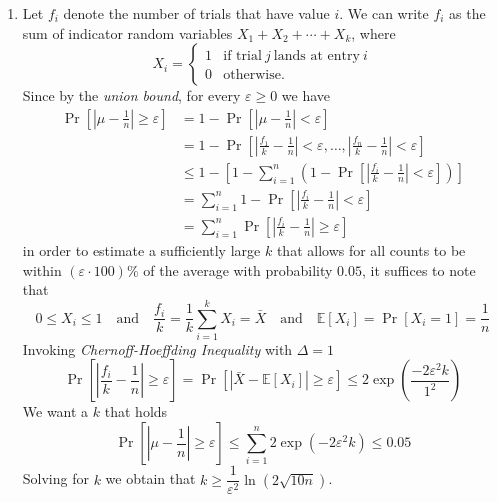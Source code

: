 \documentclass{article}
\begin{document}
\begin{enumerate}[leftmargin={*}, font={\bf}, label={\arabic*.}, ref={\arabic*}]
\begin{enumerate}[label={(\Alph*)}]
      \item \label{qst:3B}
        Let $X$ denote the number of trials needed to exhaust all entries in $[n]$. Then
        following a similar probabilistic analysis to the Coupon Collectors problem discussed
        in class, we set $n$ to $1000$ to obtain (in expectation):
        \[
          \mathbb{E}[X] = n \sum_{i=1}^{n} \frac{1}{i} = 1000 \sum_{i=1}^{1000} \frac{1}{i} = 7485.48.
        \]
        This result deviates only by a small margin from the experimental result from \ref{qst:2C}.
    \end{enumerate}

  \item \label{qst:4}
    Let $f_i$ denote the number of trials that have value $i$. We can write $f_i$ as the
    sum of indicator random variables $X_1 + X_2 + \cdots + X_k$, where
    \[
      X_i = 
        \begin{cases}
          1 & \text{if trial}\ j\ \text{lands at entry}\ i \\
          0 & \text{otherwise}.
        \end{cases}
    \]
    Since by the \emph{union bound}, for every $\varepsilon \geq 0$ we have
    \begin{align*}
      \Pr\left[\left|\mu - \frac{1}{n}\right| \geq \varepsilon\right]
      &= 1 - \Pr\left[\left|\mu - \frac{1}{n}\right| < \varepsilon\right] \\
      &= 1 - \Pr\left[\left|\frac{f_1}{k} - \frac{1}{n}\right| < \varepsilon, \ldots, \left|\frac{f_n}{k} - \frac{1}{n}\right| < \varepsilon\right] \\
      &\leq 1 - \left[1 - \sum_{i=1}^{n} \left(1 - \Pr\left[\left|\frac{f_i}{k} - \frac{1}{n}\right| < \varepsilon \right]\right)\right] \\
      &= \sum_{i=1}^{n} 1 - \Pr\left[\left|\frac{f_i}{k} - \frac{1}{n}\right| < \varepsilon \right] \\
      &= \sum_{i=1}^{n} \Pr\left[\left|\frac{f_i}{k} - \frac{1}{n}\right| \geq \varepsilon \right]
    \end{align*}
    in order to estimate a sufficiently large $k$ that allows for all counts to be within
    $(\varepsilon \cdot 100)\%$ of the average with probability $0.05$, it suffices to note
    that
    \[
      0 \leq X_i \leq 1 \quad \text{and} \quad
      \frac{f_i}{k} = \frac{1}{k}\sum_{i=1}^k X_i = \bar{X} \quad \text{and} \quad
      \mathbb{E}[X_i] = \Pr[X_i = 1] = \frac{1}{n}
    \]
    Invoking \emph{Chernoff-Hoeffding Inequality} with $\Delta = 1$
    \[
      \Pr\left[\left|\frac{f_i}{k} - \frac{1}{n}\right| \geq \varepsilon \right] =
      \Pr\left[\left|\bar{X} - \mathbb{E}[X_i] \right| \geq \varepsilon \right] \leq
      2\exp\left(\frac{-2 \varepsilon^{2} k}{1^2}\right)
    \]
    We want a $k$ that holds
    \[
      \Pr\left[\left|\mu - \frac{1}{n}\right| \geq \varepsilon\right] \leq \sum_{i=1}^n 2\exp\left(-2\varepsilon^{2}k \right) \leq 0.05
    \]
    Solving for $k$ we obtain that $k \geq \dfrac{1}{\varepsilon^2} \ln\left(2\sqrt{10n}\right)$. \medskip


\end{enumerate}
\end{document}
